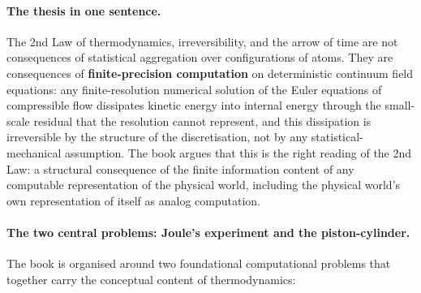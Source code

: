 \paragraph{The thesis in one sentence.}
The 2nd Law of thermodynamics, irreversibility, and the arrow of time are not consequences of statistical aggregation over configurations of atoms. They are consequences of \textbf{finite-precision computation} on deterministic continuum field equations: any finite-resolution numerical solution of the Euler equations of compressible flow dissipates kinetic energy into internal energy through the small-scale residual that the resolution cannot represent, and this dissipation is irreversible by the structure of the discretisation, not by any statistical-mechanical assumption. The book argues that this is the right reading of the 2nd Law: a structural consequence of the finite information content of any computable representation of the physical world, including the physical world's own representation of itself as analog computation.

\paragraph{The two central problems: Joule's experiment and the piston-cylinder.}
The book is organised around two foundational computational problems that
together carry the conceptual content of thermodynamics:

